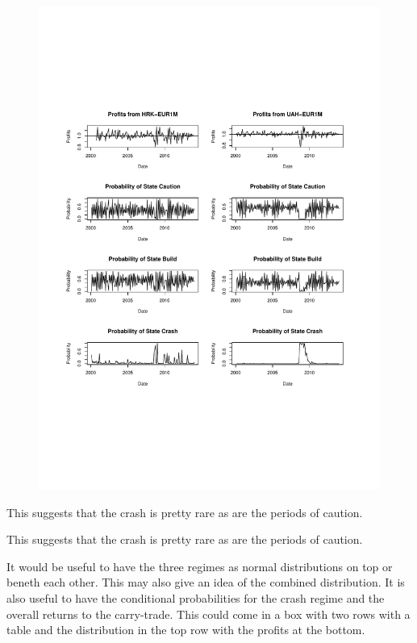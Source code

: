 \documentclass[12pt, a4paper, oneside]{article} %
\begin{document}
\begin{figure}[h!]
\centering
\includegraphics[scale = .80]{../Figures/3RegProb/HRKUAHEUR.pdf}
\end{figure}

This suggests that the crash is pretty rare as are the periods of caution. 


This suggests that the crash is pretty rare as are the periods of caution. 



It would be useful to have the three regimes as normal distributions on top or beneth each other. This may also give an idea of the combined distribution.  It is also useful to have the conditional probabilities for the crash regime and the overall returns to the carry-trade.  This could come in a box with two rows with a table and the distribution in the top row with the profits at the bottom. 
\end{document}
